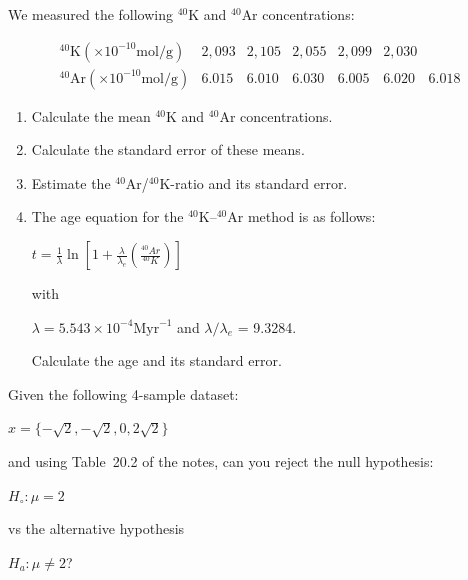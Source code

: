 \documentclass{article}
\begin{document}
\vspace{1cm}

\noindent\begin{minipage}{.5\linewidth}

We measured the following $^{40}$K and $^{40}$Ar concentrations:

\begin{equation*}
  \begin{array}{c|cccccc}
    ^{40}\mbox{K} (\times{10}^{-10} \mbox{mol/g}) & 2,093 & 2,105 & 2,055 & 2,099 & 2,030 & ~ \\
    ^{40}\mbox{Ar} (\times{10}^{-10} \mbox{mol/g}) & 6.015 & 6.010 & 6.030 & 6.005 & 6.020 & 6.018
  \end{array}
\end{equation*}

\begin{enumerate}
\item Calculate the mean $^{40}$K and $^{40}$Ar concentrations.
\item Calculate the standard error of these means.
\item Estimate the $^{40}$Ar/$^{40}$K-ratio and its standard error.
\item The age equation for the $^{40}$K--$^{40}$Ar method is as follows:

  \( t = \frac{1}{\lambda} \ln\left[ 1 + \frac{\lambda}{\lambda_e} \left(\frac{^{40}Ar }{^{40}K}\right) \right] \)

  with

  \(\lambda = 5.543 \times 10^{-4} \mbox{Myr}^{-1}\) and \(\lambda/\lambda_e\) = 9.3284.

  Calculate the age and its standard error.

\end{enumerate}

\end{minipage}

\vspace{1cm}

\begin{minipage}{16cm}
Given the following 4-sample dataset:\medskip

$x = \{-\sqrt{2},-\sqrt{2},0,2\sqrt{2}\}$\medskip

and using Table~20.2 of the notes, can you reject the null hypothesis:\medskip

$H_\circ: \mu = 2$\medskip

vs the alternative hypothesis\medskip

$H_a: \mu \neq 2$?

\end{minipage}
\end{document}
